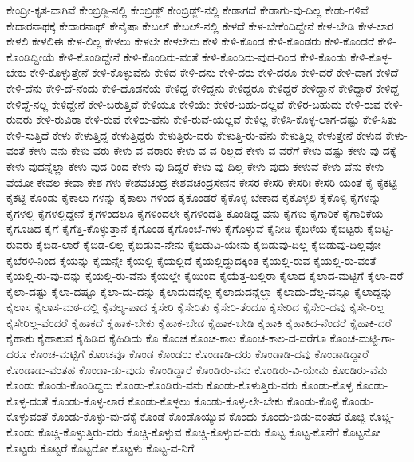 {ಕೇಂದ್ರೀ-ಕೃತ-ವಾಗಿವೆ
ಕೇಂಬ್ರಿಡ್ಜಿ-ನಲ್ಲಿ
ಕೇಂಬ್ರಿಡ್ಜ್
ಕೇಂಬ್ರಿಡ್ಜ್-ನಲ್ಲಿ
ಕೇಡಾಗದೆ
ಕೇಡಾಗು-ವು-ದಿಲ್ಲ
ಕೇಡು-ಗಳಿವೆ
ಕೇದಾರನಾಥಕ್ಕೆ
ಕೇದಾರನಾಥ್
ಕೇನೈಷಾ
ಕೇಬಲ್
ಕೇಬಲ್-ನಲ್ಲಿ
ಕೇಳದೆ
ಕೇಳ-ಬೇಕೆಂದಿದ್ದೇನೆ
ಕೇಳ-ಬೇಡಿ
ಕೇಳ-ಲಾರ
ಕೇಳಲಿ
ಕೇಳಲಿಈ
ಕೇಳ-ಲಿಲ್ಲ
ಕೇಳಲು
ಕೇಳಲೇ
ಕೇಳಲೇನು
ಕೇಳಿ
ಕೇಳಿ-ಕೊಂಡ
ಕೇಳಿ-ಕೊಂಡರು
ಕೇಳಿ-ಕೊಂಡರೆ
ಕೇಳಿ-ಕೊಂಡಿದ್ದೀಯೆ
ಕೇಳಿ-ಕೊಂಡಿದ್ದೇನೆ
ಕೇಳಿ-ಕೊಂಡಿರು-ವಂತೆ
ಕೇಳಿ-ಕೊಂಡಿರು-ವುದ-ರಿಂದ
ಕೇಳಿ-ಕೊಂಡು
ಕೇಳಿ-ಕೊಳ್ಳ-ಬೇಕು
ಕೇಳಿ-ಕೊಳ್ಳುತ್ತೇನೆ
ಕೇಳಿ-ಕೊಳ್ಳುವೆನು
ಕೇಳಿದ
ಕೇಳಿ-ದನು
ಕೇಳಿ-ದರು
ಕೇಳಿ-ದರೂ
ಕೇಳಿ-ದರೆ
ಕೇಳಿ-ದಾಗ
ಕೇಳಿದೆ
ಕೇಳಿ-ದೆನು
ಕೇಳಿ-ದೆ-ನೆಂದು
ಕೇಳಿ-ದೊಡನೆಯೆ
ಕೇಳಿದ್ದ
ಕೇಳಿದ್ದನು
ಕೇಳಿದ್ದರೂ
ಕೇಳಿದ್ದರೆ
ಕೇಳಿದ್ದಾನೆ
ಕೇಳಿದ್ದಾರೆ
ಕೇಳಿದ್ದೆ
ಕೇಳಿದ್ದೆ-ನಲ್ಲ
ಕೇಳಿದ್ದೇನೆ
ಕೇಳಿ-ಬರುತ್ತಿವೆ
ಕೇಳಿಯೂ
ಕೇಳಿಯೇ
ಕೇಳಿರ-ಬಹು-ದಲ್ಲವೆ
ಕೇಳಿರ-ಬಹುದು
ಕೇಳಿ-ರುವ
ಕೇಳಿ-ರುವರು
ಕೇಳಿ-ರುವಿರಾ
ಕೇಳಿ-ರುವೆ
ಕೇಳಿರು-ವೆನು
ಕೇಳಿ-ರುವೆ-ಯಲ್ಲವೆ
ಕೇಳಿಲ್ಲ
ಕೇಳಿಸಿ-ಕೊಳ್ಳ-ಲಾಗ-ದಷ್ಟು
ಕೇಳಿ-ಸಿತು
ಕೇಳಿ-ಸುತ್ತಿದೆ
ಕೇಳು
ಕೇಳುತ್ತಿದ್ದ
ಕೇಳುತ್ತಿದ್ದರು
ಕೇಳುತ್ತಿರು-ವರು
ಕೇಳುತ್ತಿ-ರು-ವೆನು
ಕೇಳುತ್ತಿಲ್ಲ
ಕೇಳುತ್ತೇನೆ
ಕೇಳುವ
ಕೇಳು-ವಂತೆ
ಕೇಳು-ವನು
ಕೇಳು-ವರು
ಕೇಳು-ವ-ವರಾರು
ಕೇಳು-ವ-ವ-ರಿಲ್ಲದೆ
ಕೇಳು-ವ-ವರೆಗೆ
ಕೇಳು-ವಷ್ಟು
ಕೇಳು-ವು-ದಕ್ಕೆ
ಕೇಳು-ವುದನ್ನೆಲ್ಲಾ
ಕೇಳು-ವುದ-ರಿಂದ
ಕೇಳು-ವು-ದಿದ್ದರೆ
ಕೇಳು-ವು-ದಿಲ್ಲ
ಕೇಳು-ವುದು
ಕೇಳುವೆ
ಕೇಳು-ವೆನು
ಕೇಳು-ವೆಯೋ
ಕೇವಲ
ಕೇವಾ
ಕೇಶ-ಗಳು
ಕೇಶವಚಂದ್ರ
ಕೇಶವಚಂದ್ರಸೇನನ
ಕೇಸರ
ಕೇಸರಿ
ಕೇಸರಿಃ
ಕೇಸರಿ-ಯಂತೆ
ಕೈ
ಕೈಕಟ್ಟಿ
ಕೈಕಟ್ಟಿ-ಕೊಂಡು
ಕೈಕಾಲು-ಗಳನ್ನು
ಕೈಕಾಲು-ಗಳಿಂದ
ಕೈಕೊಂಡರೆ
ಕೈಕೊಳ್ಳ-ಬೇಕಾದ
ಕೈಕೊಳ್ಳಲಿ
ಕೈಕೊಳ್ಳಿ
ಕೈಗಳನ್ನು
ಕೈಗಳಲ್ಲಿ
ಕೈಗಳಲ್ಲಿದ್ದೇನೆ
ಕೈಗಳಿಂದಲೂ
ಕೈಗಳಿಂದಲೇ
ಕೈಗಳಿಂದೆತ್ತಿ-ಕೊಂಡಿದ್ದ-ವನು
ಕೈಗಳು
ಕೈಗಾರಿಕೆ
ಕೈಗಾರಿಕೆಯ
ಕೈಗೂಡಿದ
ಕೈಗೆ
ಕೈಗೆತ್ತಿ-ಕೊಳ್ಳುತ್ತಾನೆ
ಕೈಗೊಂಡ
ಕೈಗೊಂಬೆ-ಗಳು
ಕೈಗೊಳ್ಳುವೆ
ಕೈನೀಡಿ
ಕೈಬಳೆಯ
ಕೈಬಿಟ್ಟರು
ಕೈಬಿಟ್ಟಿ-ರುವರು
ಕೈಬಿಡ-ಲಾರೆ
ಕೈಬಿಡ-ಲಿಲ್ಲ
ಕೈಬಿಡುವ-ನೇನು
ಕೈಬಿಡುವಿ-ಯೇನು
ಕೈಬಿಡುವು-ದಿಲ್ಲ
ಕೈಬಿಡುವು-ದಿಲ್ಲವೋ
ಕೈಬೆರಳಿ-ನಿಂದ
ಕೈಯನ್ನು
ಕೈಯನ್ನೇ
ಕೈಯಲ್ಲಿ
ಕೈಯಲ್ಲಿದೆ
ಕೈಯಲ್ಲಿದ್ದುದಕ್ಕಿಂತ
ಕೈಯಲ್ಲಿ-ರುವ
ಕೈಯಲ್ಲಿ-ರು-ವಂತೆ
ಕೈಯಲ್ಲಿ-ರು-ವು-ದನ್ನು
ಕೈಯಲ್ಲಿ-ರು-ವೆನು
ಕೈಯಲ್ಲೇ
ಕೈಯಿಂದ
ಕೈಯೆತ್ತ-ಬಲ್ಲಿರಾ
ಕೈಲಾದ
ಕೈಲಾದ-ಮಟ್ಟಿಗೆ
ಕೈಲಾ-ದರೆ
ಕೈಲಾ-ದಷ್ಟು
ಕೈಲಾ-ದಷ್ಟೂ
ಕೈಲಾ-ದು-ದನ್ನು
ಕೈಲಾದುದನ್ನೆಲ್ಲ
ಕೈಲಾದುದನ್ನೆಲ್ಲಾ
ಕೈಲಾದು-ದೆಲ್ಲ-ವನ್ನೂ
ಕೈಲಾದ್ದನ್ನು
ಕೈಲಾಸ
ಕೈಲಾಸ-ಮಠ-ದಲ್ಲಿ
ಕೈವಲ್ಯ-ಪಾದ
ಕೈಸೇರಿ
ಕೈಸೇರಿತು
ಕೈಸೇರಿ-ತೆಂದೂ
ಕೈಸೇರಿದ
ಕೈಸೇರಿ-ದವು
ಕೈಸೇ-ರಿಲ್ಲ
ಕೈಸೇರಿಲ್ಲ-ವೆಂದರೆ
ಕೈಹಾಕದೆ
ಕೈಹಾಕ-ಬೇಕು
ಕೈಹಾಕ-ಬೇಡ
ಕೈಹಾಕ-ಬೇಡಿ
ಕೈಹಾಕಿ
ಕೈಹಾಕಿದ-ನೆಂದರೆ
ಕೈಹಾಕಿ-ದರೆ
ಕೈಹಾಕು
ಕೈಹಾಕುವ
ಕೈಹಿಡಿದ
ಕೈಹಿಡಿದು
ಕೊ
ಕೊಂಚ
ಕೊಂಚ-ಕಾಲ
ಕೊಂಚ-ಕಾಲ-ದ-ವರೆಗೂ
ಕೊಂಚ-ಮಟ್ಟಿ-ಗಾ-ದರೂ
ಕೊಂಚ-ಮಟ್ಟಿಗೆ
ಕೊಂಚವೂ
ಕೊಂಡ
ಕೊಂಡರು
ಕೊಂಡಾಡಿ-ದರು
ಕೊಂಡಾಡಿ-ದವು
ಕೊಂಡಾಡಿದ್ದಾರೆ
ಕೊಂಡಾಡು-ವಂತಹ
ಕೊಂಡಾ-ಡು-ವುದು
ಕೊಂಡಿದ್ದಾರೆ
ಕೊಂಡಿರು-ವನು
ಕೊಂಡಿರು-ವಿ-ಯೇನು
ಕೊಂಡಿರು-ವೆನು
ಕೊಂಡು
ಕೊಂಡು-ಕೊಂಡಿದ್ದರು
ಕೊಂಡು-ಕೊಂಡಿರು-ವನು
ಕೊಂಡು-ಕೊಳುತ್ತಿರು-ವರು
ಕೊಂಡು-ಕೊಳ್ಳ
ಕೊಂಡು-ಕೊಳ್ಳ-ದಂತೆ
ಕೊಂಡು-ಕೊಳ್ಳ-ಲಾರೆ
ಕೊಂಡು-ಕೊಳ್ಳಲು
ಕೊಂಡು-ಕೊಳ್ಳ-ಲೇ-ಬೇಕು
ಕೊಂಡು-ಕೊಳ್ಳಿ
ಕೊಂಡು-ಕೊಳ್ಳುವಂತೆ
ಕೊಂಡು-ಕೊಳ್ಳು-ವು-ದಕ್ಕೆ
ಕೊಂಡೆ
ಕೊಂಡೊಯ್ಯುವ
ಕೊಂದು
ಕೊಂದು-ಬಿಡು-ವಂತಹ
ಕೊಚ್ಚಿ
ಕೊಚ್ಚಿ-ಕೊಂಡು
ಕೊಚ್ಚಿ-ಕೊಳ್ಳುತ್ತಿರು-ವರು
ಕೊಚ್ಚಿ-ಕೊಳ್ಳುವ
ಕೊಚ್ಚಿ-ಕೊಳ್ಳುವ-ವರು
ಕೊಟ್ಟ
ಕೊಟ್ಟ-ಕೊನೆಗೆ
ಕೊಟ್ಟನೋ
ಕೊಟ್ಟರು
ಕೊಟ್ಟರೆ
ಕೊಟ್ಟರೋ
ಕೊಟ್ಟಳು
ಕೊಟ್ಟ-ವ-ನಿಗೆ
}
